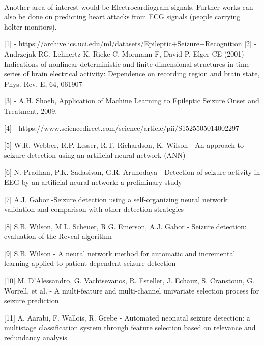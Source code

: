 \documentclass{llncs}       %
\begin{document}
\paragraph{}
Another area of interest would be Electrocardiogram signals. Further works can also be done on predicting heart attacks from ECG signals (people carrying holter monitors). 





\begin{thebibliography}{}
%
%



$[$1$]$ - \underline{https://archive.ics.uci.edu/ml/datasets/Epileptic+Seizure+Recognition}
$[$2$]$ - Andrzejak RG, Lehnertz K, Rieke C, Mormann F, David P, Elger 
CE (2001) Indications of nonlinear deterministic and finite dimensional 
structures in time series of brain electrical activity: Dependence on 
recording region and brain state, Phys. Rev. E, 64, 061907

$[$3$]$ - A.H. Shoeb, Application of Machine Learning to Epileptic 
Seizure Onset and Treatment, 2009.

$[$4$]$ - 
https://www.sciencedirect.com/science/article/pii/S1525505014002297

$[$5$]$ W.R. Webber, R.P. Lesser, R.T. Richardson, K. Wilson - An 
approach to seizure detection using an artificial neural network (ANN)

$[$6$]$ N. Pradhan, P.K. Sadasivan, G.R. Arunodaya - Detection of 
seizure activity in EEG by an artificial neural network: a preliminary 
study

$[$7$]$ A.J. Gabor -Seizure detection using a self-organizing neural 
network: validation and comparison with other detection strategies

$[$8$]$ S.B. Wilson, M.L. Scheuer, R.G. Emerson, A.J. Gabor - Seizure 
detection: evaluation of the Reveal algorithm

$[$9$]$ S.B. Wilson - A neural network method for automatic and 
incremental learning applied to patient-dependent seizure detection

$[$10$]$ M. D'Alessandro, G. Vachtsevanos, R. Esteller, J. Echauz, S. 
Cranstoun, G. Worrell, et al. - A multi-feature and multi-channel 
univariate selection process for seizure prediction

$[$11$]$ A. Aarabi, F. Wallois, R. Grebe - Automated neonatal seizure 
detection: a multistage classification system through feature selection 
based on relevance and redundancy analysis


\end{thebibliography}
\end{document}
